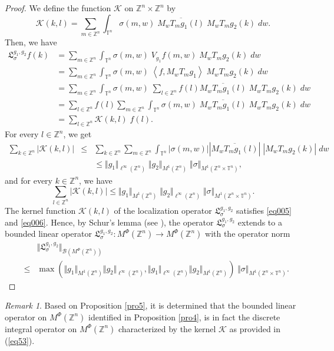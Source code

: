 \documentclass[a4paper,11pt, reqno]{amsart}
\theoremstyle{plain}
\theoremstyle{definition}
\theoremstyle{remark}
\newtheorem{remark}[theorem]{Remark}
\def \Z{{\mathbb Z}}
\def \T{{\mathbb T}}
\begin{document}
\begin{proof}
We define the function $\mathcal{K}$ on $\Z^n \times \Z^n$ by
\begin{equation}\label{eq53}
\mathcal{K}(k, l) = \sum_{m \in \Z^n}  \int_{\T^n} \sigma(m, w)\; \overline{M_w T_m g_1(l)} \; M_w T_m g_2(k) \; dw.
\end{equation}
Then, we have
\begin{align*}
\mathfrak{L}^{g_1, g_2}_{\sigma}f(k)
& = \sum_{m \in \Z^n}  \int_{\T^n} \sigma(m, w) \; V_{g_1}f(m,w) \; M_w T_m g_2(k) \; dw \\
& = \sum_{m \in \Z^n}  \int_{\T^n} \sigma(m, w) \; \left\langle f, M_w T_m {g_1} \right\rangle \; M_w T_m g_2(k) \; dw \\
& = \sum_{m \in \Z^n}  \int_{\T^n} \sigma(m, w) \; \sum_{l \in \Z^n} f(l) \overline{M_w T_m {g_1} (l)} \; M_w T_m g_2(k) \; dw \\
& = \sum_{l \in \Z^n} f(l) \sum_{m \in \Z^n}  \int_{\T^n}  \sigma(m, w) \; \overline{M_w T_m {g_1} (l)}\; M_w T_m g_2(k) \; dw \\
& = \sum_{l \in \Z^n} \mathcal{K}(k,l) \; f(l).
\end{align*}
For every $l \in \Z^n$, we get
\begin{eqnarray}\label{eq005}
\sum_{k \in \Z^n} | \mathcal{K}(k, l) | 
&\leq & \sum_{k \in \Z^n} \sum_{m \in \Z^n}  \int_{\T^n} |\sigma(m, w)| \left|\overline{ M_w T_m g_1(l)} \right| \; \left|M_w T_m g_2(k) \right| \; dw \nonumber \\
&& \leq \Vert g_1 \Vert_{\ell^\infty(\Z^n)} \; \Vert g_2 \Vert_{M^1(\Z^n)} \; \Vert \sigma \Vert_{M^1(\Z^n \times \T^n)}, 
\end{eqnarray} 
and for every $k \in \Z^n$, we have
\begin{equation}\label{eq006}
\sum_{l \in \Z^n} | \mathcal{K}(k, l) | \leq \Vert g_1 \Vert_{M^1(\Z^n)} \; \Vert g_2 \Vert_{\ell^\infty(\Z^n)} \; \Vert \sigma \Vert_{M^1(\Z^n \times \T^n)}.
\end{equation}
The kernel function $\mathcal{K}(k, l)$ of the localization operator $\mathfrak{L}^{g_1, g_2}_{\sigma}$ satisfies \eqref{eq005} and \eqref{eq006}. Hence, by Schur's lemma (see \cite{fol95}), the operator $\mathfrak{L}^{g_1, g_2}_{\sigma}$ extends to a bounded linear operator $\mathfrak{L}^{g_1, g_2}_{\sigma}: M^{\Phi}(\Z^n) \to  M^{\Phi}(\Z^n)$ with the operator norm 
\begin{eqnarray*}
&& \Vert \mathfrak{L}^{g_1, g_2}_{\sigma} \Vert_{\mathcal{B}(M^{\Phi}(\Z^n))} \\
& \leq & \max(\Vert g_1 \Vert_{M^1(\Z^n)} \Vert g_2 \Vert_{\ell^\infty(\Z^n)}, \Vert g_1 \Vert_{\ell^\infty(\Z^n)} \Vert g_2 \Vert_{M^1(\Z^n)}) \; \Vert \sigma \Vert_{M^1(\Z^n \times \T^n)}.
\end{eqnarray*}
\end{proof} 
\begin{remark}
Based on Proposition \ref{pro5}, it is determined that the bounded linear operator on $M^{\Phi}(\Z^n)$ identified in Proposition \ref{pro4}, is in fact the discrete integral operator on  $M^{\Phi}(\Z^n)$ characterized by the kernel $\mathcal{K}$ as provided in (\ref{eq53}).
\end{remark}
\end{document}
